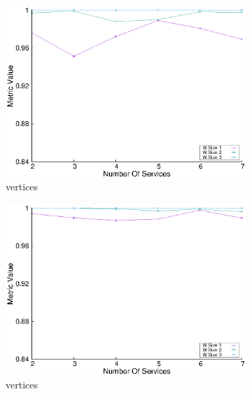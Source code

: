 \begin{figure}[H]
  \begin{subfigure}{0.45\textwidth}
    \includegraphics[width=\textwidth]{Images/graphs/window_quality_performance_diff_qual_n7_s7_20_100_n3}
    \caption{ vertices}
    \label{fig:quality_window_wide_qualitative_n3}
  \end{subfigure}
  \hfill
  \begin{subfigure}{0.45\textwidth}
    \includegraphics[width=\textwidth]{Images/graphs/window_quality_performance_diff_qual_n7_s7_50_80_n3}
    \caption{ vertices}
    \label{fig:quality_window_average_qualitative_n3}
  \end{subfigure}
  \begin{subfigure}{0.45\textwidth}

\end{subfigure}
\end{figure}
